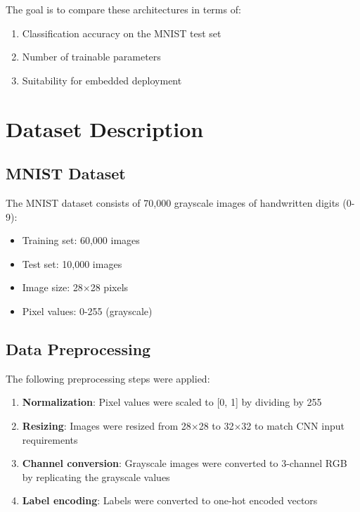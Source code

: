 \documentclass[12pt,a4paper]{article}
\begin{document}
The goal is to compare these architectures in terms of:
\begin{enumerate}
    \item Classification accuracy on the MNIST test set
    \item Number of trainable parameters
    \item Suitability for embedded deployment
\end{enumerate}

\section{Dataset Description}

\subsection{MNIST Dataset}

The MNIST dataset consists of 70,000 grayscale images of handwritten digits (0-9):
\begin{itemize}
    \item Training set: 60,000 images
    \item Test set: 10,000 images
    \item Image size: 28$\times$28 pixels
    \item Pixel values: 0-255 (grayscale)
\end{itemize}

\subsection{Data Preprocessing}

The following preprocessing steps were applied:

\begin{enumerate}
    \item \textbf{Normalization}: Pixel values were scaled to [0, 1] by dividing by 255
    \item \textbf{Resizing}: Images were resized from 28$\times$28 to 32$\times$32 to match CNN input requirements
    \item \textbf{Channel conversion}: Grayscale images were converted to 3-channel RGB by replicating the grayscale values
    \item \textbf{Label encoding}: Labels were converted to one-hot encoded vectors
\end{enumerate}
\end{document}
